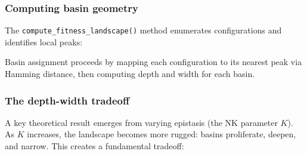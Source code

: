 \documentclass[
]{article}
\newenvironment{Shaded}{\begin{snugshade}}{\end{snugshade}}
\newcommand{\AttributeTok}[1]{\textcolor[rgb]{0.13,0.29,0.53}{#1}}
\newcommand{\DecValTok}[1]{\textcolor[rgb]{0.00,0.00,0.81}{#1}}
\newcommand{\DocumentationTok}[1]{\textcolor[rgb]{0.56,0.35,0.01}{\textbf{\textit{#1}}}}
\newcommand{\FloatTok}[1]{\textcolor[rgb]{0.00,0.00,0.81}{#1}}
\newcommand{\FunctionTok}[1]{\textcolor[rgb]{0.13,0.29,0.53}{\textbf{#1}}}
\newcommand{\NormalTok}[1]{#1}
\newcommand{\OtherTok}[1]{\textcolor[rgb]{0.56,0.35,0.01}{#1}}
\newcommand{\SpecialCharTok}[1]{\textcolor[rgb]{0.81,0.36,0.00}{\textbf{#1}}}
\begin{document}
\subsubsection{Computing basin geometry}\label{computing-basin-geometry}

The \texttt{compute\_fitness\_landscape()} method enumerates
configurations and identifies local peaks:

\begin{Shaded}
\end{Shaded}

Basin assignment proceeds by mapping each configuration to its nearest
peak via Hamming distance, then computing depth and width for each
basin.

\subsubsection{The depth-width tradeoff}\label{the-depth-width-tradeoff}

A key theoretical result emerges from varying epistasis (the NK
parameter \(K\)). As \(K\) increases, the landscape becomes more rugged:
basins proliferate, deepen, and narrow. This creates a fundamental
tradeoff:
\end{document}
